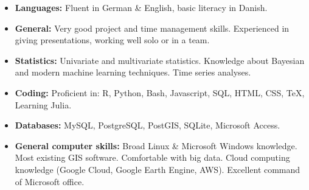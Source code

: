 \documentclass[12pt,a4paper,roman]{moderncv}        %
\begin{document}
\begin{itemize}

\item \textbf{Languages:} Fluent in German \& English, basic literacy in Danish.
\item \textbf{General:} Very good project and time management skills. Experienced in giving presentations, working well solo or in a team.
\item \textbf{Statistics:} Univariate and multivariate statistics. Knowledge about Bayesian and modern machine learning techniques. Time series analyses.
\item \textbf{Coding:} Proficient in: R, Python, Bash, Javascript, SQL, HTML, CSS, TeX, Learning Julia.
\item \textbf{Databases:} MySQL, PostgreSQL, PostGIS, SQLite, Microsoft Access.
\item \textbf{General computer skills:} Broad Linux \& Microsoft Windows knowledge. Most existing GIS software. Comfortable with big data. Cloud computing knowledge (Google Cloud, Google Earth Engine, AWS). Excellent command of Microsoft office.

\end{itemize}


\end{document}
